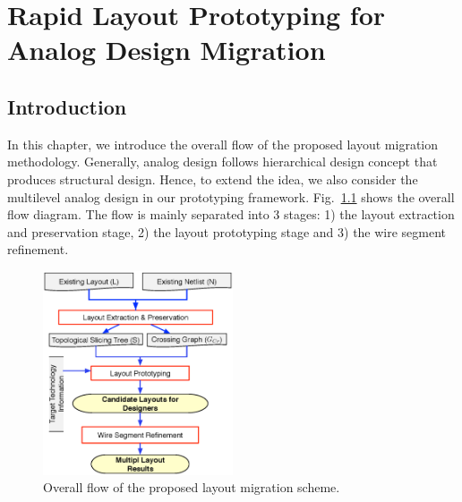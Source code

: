 
\chapter{Rapid Layout Prototyping for Analog Design Migration}\label{chap:RLPADM}
  
  \section{Introduction}\label{sec:RLPADMIntro}

    In this chapter, we introduce the overall flow of the proposed layout migration methodology. Generally, analog design follows hierarchical design concept that produces structural design. 
    Hence, to extend the idea, we also consider the multilevel analog design in our prototyping framework. Fig.~\ref{fig:Flow} shows the overall flow diagram. The flow is mainly separated into 3 stages: 1) the layout extraction and preservation stage, 2) the layout prototyping stage and 3) the wire segment refinement. 
    
    
    \begin{figure}[ht]
      \centering
      \includegraphics[width=0.5\textwidth]{Fig/Chapter4/Flow.eps}
      \caption{Overall flow of the proposed layout migration scheme.} 
      \label{fig:Flow}
    \end{figure}

